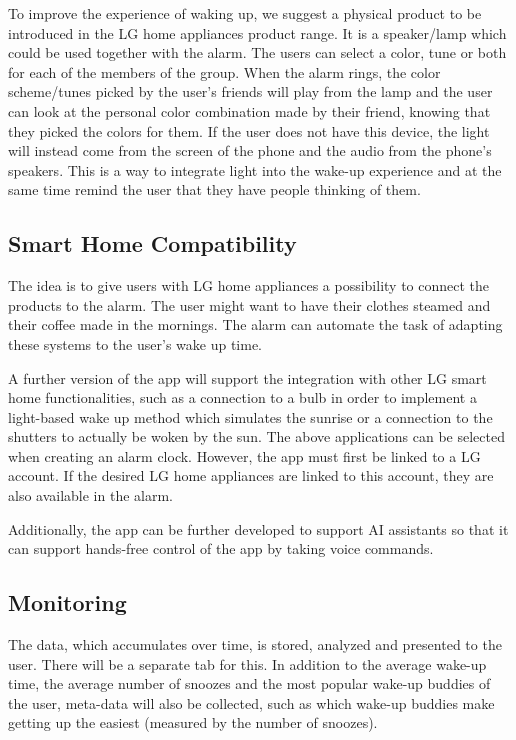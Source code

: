 \documentclass[conference]{IEEEtran}
\begin{document}
To improve the experience of waking up, we suggest a physical product to be introduced in the LG home appliances product range. It is a speaker/lamp which could be used together with the alarm. The users can select a color, tune or both for each of the members of the group. When the alarm rings, the color scheme/tunes picked by the user’s friends will play from the lamp and the user can look at the personal color combination made by their friend, knowing that they picked the colors for them. If the user does not have this device, the light will instead come from the screen of the phone and the audio from the phone’s speakers.
This is a way to integrate light into the wake-up experience and at the same time remind the user that they have people thinking of them. 

\subsection{Smart Home Compatibility}
The idea is to give users with LG home appliances a possibility to connect the products to the alarm. The user might want to have their clothes steamed and their coffee made in the mornings. The alarm can automate the task of adapting these systems to the user's wake up time. 

A further version of the app will support the integration with other LG smart home functionalities, such as a connection to a bulb in order to implement a light-based wake up method which simulates the sunrise or a connection to the shutters to actually be woken by the sun. 
The above applications can be selected when creating an alarm clock. However, the app must first be linked to a LG account. If the desired LG home appliances are linked to this account, they are also available in the alarm.

Additionally, the app can be further developed to support AI assistants so that it can support hands-free control of the app by taking voice commands.

\subsection{Monitoring}
The data, which accumulates over time, is stored, analyzed and presented to the user. There will be a separate tab for this. In addition to the average wake-up time, the average number of snoozes and the most popular wake-up buddies of the user, meta-data will also be collected, such as which wake-up buddies make getting up the easiest (measured by the number of snoozes).\\
\end{document}

